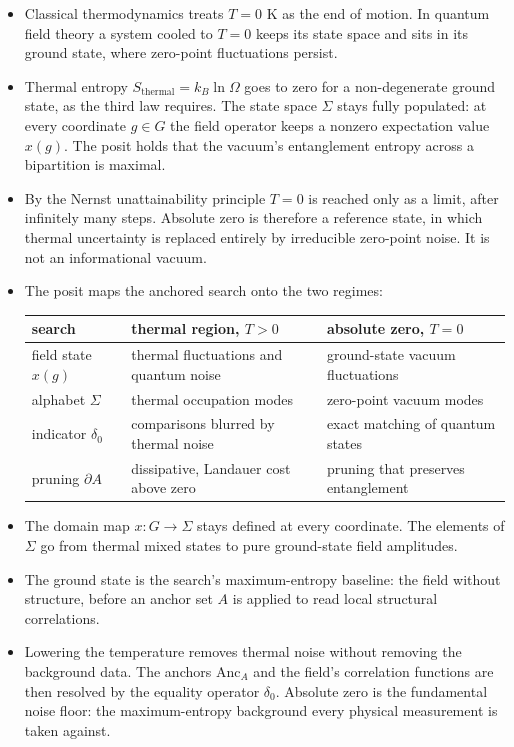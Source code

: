 \begin{itemize}
\item Classical thermodynamics treats $T = 0$ K as the end of motion. In quantum field theory a system
cooled to $T = 0$ keeps its state space and sits in its ground state, where zero-point fluctuations
persist.

\item Thermal entropy $S_{\mathrm{thermal}} = k_B \ln \Omega$ goes to zero for a non-degenerate ground
state, as the third law requires. The state space $\Sigma$ stays fully populated: at every coordinate
$g \in G$ the field operator keeps a nonzero expectation value $x(g)$. The posit holds that the
vacuum's entanglement entropy across a bipartition is maximal.

\item By the Nernst unattainability principle $T = 0$ is reached only as a limit, after infinitely
many steps. Absolute zero is therefore a reference state, in which thermal uncertainty is replaced
entirely by irreducible zero-point noise. It is not an informational vacuum.

\item The posit maps the anchored search onto the two regimes:

\begin{center}
\begin{tabular}{lll}
\toprule
search & thermal region, $T > 0$ & absolute zero, $T = 0$ \\
\midrule
field state $x(g)$ & thermal fluctuations and quantum noise & ground-state vacuum fluctuations \\
alphabet $\Sigma$ & thermal occupation modes & zero-point vacuum modes \\
indicator $\delta_0$ & comparisons blurred by thermal noise & exact matching of quantum states \\
pruning $\partial A$ & dissipative, Landauer cost above zero & pruning that preserves entanglement \\
\bottomrule
\end{tabular}
\end{center}

\item The domain map $x : G \to \Sigma$ stays defined at every coordinate. The elements of $\Sigma$ go
from thermal mixed states to pure ground-state field amplitudes.

\item The ground state is the search's maximum-entropy baseline: the field without structure, before
an anchor set $A$ is applied to read local structural correlations.

\item Lowering the temperature removes thermal noise without removing the background data. The
anchors $\mathrm{Anc}_A$ and the field's correlation functions are then resolved by the equality
operator $\delta_0$. Absolute zero is the fundamental noise floor: the maximum-entropy background every
physical measurement is taken against.
\end{itemize}

